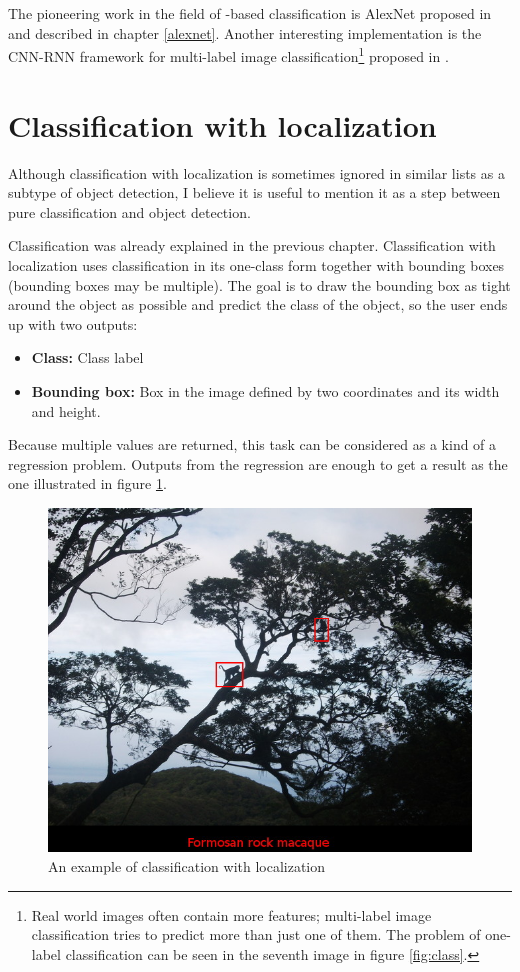 The pioneering work in the field of -based classification is AlexNet 
proposed in \cite{cnn-classification} and described in chapter \ref{alexnet}. 
Another interesting implementation is the CNN-RNN framework for multi-label 
image classification\footnote{Real world images often contain more features; 
multi-label image classification tries to predict more than just one of them. 
The problem of one-label classification can be seen in the seventh image in 
figure \ref{fig:class}.} proposed in \cite{multi-classification}.

\section{Classification with localization}
\label{classification-localization}

Although classification with localization is sometimes ignored in similar lists 
as a subtype of object detection, I believe it is useful to mention it as a step 
between pure classification and object detection.

Classification was already explained in the previous chapter. Classification 
with localization uses classification in its one-class form together with 
bounding boxes (bounding boxes may be multiple). The goal is to draw the 
bounding box as tight around the object as possible and predict the class of the 
object, so the user ends up with two outputs:
\begin{itemize}
	\item \textbf{Class:} Class label
	\item \textbf{Bounding box:} Box in the image defined by two coordinates and 
its width and height.
\end{itemize}

Because multiple values are returned, this task can be considered as a kind of a 
regression problem. Outputs from the regression are enough to get a result as 
the one illustrated in figure \ref{fig:class-loc}. 

\begin{figure}[H]
   \centering
	\includegraphics[width=.7\linewidth]{./pictures/class-loc.JPG}
	\caption[Classification with localization example]{An example of classification 
with localization}
      \label{fig:class-loc}
\end{figure}

